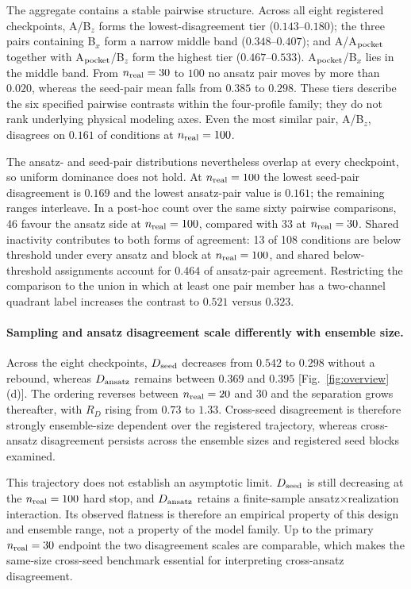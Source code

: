 \documentclass[aip,jap,reprint,superscriptaddress,longbibliography,floatfix]{revtex4-2}
\begin{document}
The aggregate contains a stable pairwise structure. Across all eight registered
checkpoints, A/B$_z$ forms the lowest-disagreement tier
($0.143$--$0.180$); the three pairs containing B$_x$ form a narrow middle band
($0.348$--$0.407$); and A/A$_{\rm pocket}$ together with
A$_{\rm pocket}$/B$_z$ form the highest tier ($0.467$--$0.533$).
A$_{\rm pocket}$/B$_x$ lies in the middle band. From
$n_{\rm real}=30$ to $100$ no ansatz pair moves by more than $0.020$,
whereas the seed-pair mean falls from $0.385$ to $0.298$. These tiers describe the six specified pairwise contrasts within the
four-profile family; they do not rank underlying physical modeling axes. Even
the most similar pair,
A/B$_z$, disagrees on $0.161$ of conditions at $n_{\rm real}=100$.

The ansatz- and seed-pair distributions nevertheless overlap at every
checkpoint, so uniform dominance does not hold. At $n_{\rm real}=100$ the
lowest seed-pair disagreement is $0.169$ and the lowest ansatz-pair value is
$0.161$; the remaining ranges interleave. In a post-hoc count over the same
sixty pairwise comparisons, 46 favour the ansatz side at $n_{\rm real}=100$,
compared with 33 at $n_{\rm real}=30$. Shared inactivity contributes to both
forms of agreement: 13 of 108 conditions are below threshold under every
ansatz and block at $n_{\rm real}=100$, and shared below-threshold assignments
account for $0.464$ of ansatz-pair agreement. Restricting the comparison to the
union in which at least one pair member has a two-channel quadrant label
increases the contrast to $0.521$ versus $0.323$.

\paragraph{Sampling and ansatz disagreement scale differently with ensemble size.}
Across the eight checkpoints, $D_{\rm seed}$ decreases from $0.542$ to
$0.298$ without a rebound, whereas $D_{\rm ansatz}$ remains between $0.369$ and
$0.395$ [Fig.~\ref{fig:overview}(d)]. The ordering reverses between
$n_{\rm real}=20$ and $30$ and the separation grows thereafter, with $R_D$
rising from $0.73$ to $1.33$. Cross-seed disagreement is therefore strongly
ensemble-size dependent over the registered trajectory, whereas cross-ansatz
disagreement persists across the ensemble sizes and registered seed blocks
examined.

This trajectory does not establish an asymptotic limit. $D_{\rm seed}$ is still
decreasing at the $n_{\rm real}=100$ hard stop, and $D_{\rm ansatz}$ retains a
finite-sample ansatz$\times$realization interaction. Its observed flatness is
therefore an empirical property of this design and ensemble range, not a
property of the model family. Up to the primary
$n_{\rm real}=30$ endpoint the two disagreement scales are comparable, which
makes the same-size cross-seed benchmark essential for interpreting
cross-ansatz disagreement.
\end{document}
